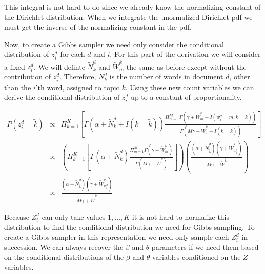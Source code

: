 \documentclass[11pt]{amsart}
\begin{document}
\noindent This integral is not hard to do since we already know the normalizing constant of the Dirichlet distribution.  When we integrate the unormalized Dirichlet pdf we must get the inverse of the normalizing constant in the pdf.

Now, to create a Gibbs sampler we need only consider the conditional distribution of $z^d_i$ for each $d$ and $i$.  For this part of the derivation we will consider a fixed $z^d_i$.  We will definte $\tilde N_k^d$ and $\tilde W^k_m$ the same as before except without the contribution of $z^d_i$.  Therefore, $N^d_k$ is the number of words in document $d$, other than the $i$'th word, assigned to topic $k$.  Using these new count variables we can derive the conditional distribution of $z_i^d$ up to a constant of proportionality.

\begin{eqnarray*}
  P(z^d_i = \tilde k) &\propto& \Pi_{k = 1}^K \left[ \Gamma(\alpha + \tilde N_k^d + I(k = \tilde k)) \frac{\Pi_{m = 1}^M \Gamma(\gamma + \tilde W_m^k + I(w^d_i = m, k = \tilde k))}{ \Gamma(M\gamma + \tilde W_.^k + I(k = \tilde k))} \right]\\
&\propto& \left( \Pi_{k = 1}^K \left[ \Gamma(\alpha + \tilde N_k^d) \frac{\Pi_{m = 1}^M \Gamma(\gamma + \tilde W_m^k)}{ \Gamma(M\gamma + \tilde W_.^k)} \right] \right) \left( \frac{(\alpha + \tilde N^d_{\tilde k})(\gamma + \tilde W_{w^d_i}^{\tilde k})}{M\gamma + \tilde W_.^{\tilde k}}  \right)\\
&\propto&  \frac{(\alpha + \tilde N^d_{\tilde k})(\gamma + \tilde W_{w^d_i}^{\tilde k})}{M\gamma + \tilde W_.^{\tilde k}}
\end{eqnarray*}

\noindent Because $Z_i^d$ can only take values $1, \ldots, K$ it is not hard to normalize this distribution to find the conditional distribution we need for Gibbs sampling.  To create a Gibbs sampler in this representation we need only sample each $Z_i^d$ in succession.  We can always recover the $\beta$ and $\theta$ parameters if we need them based on the conditional distributions of the $\beta$ and $\theta$ variables conditioned on the $Z$ variables.
\end{document}
